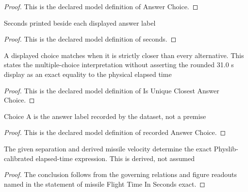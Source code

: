 \begin{proof}
  This is the declared model definition of Answer Choice.
\end{proof}
\begin{definition}[seconds]
  \label{def:physics:phyx-mini-0607:phyxminiproblems-problemphyxmini0607-answerchoice-seconds}
  Seconds printed beside each displayed answer label
\end{definition}
\begin{proof}
  This is the declared model definition of seconds.
\end{proof}
\begin{definition}
  \label{def:physics:phyx-mini-0607:phyxminiproblems-problemphyxmini0607-isuniqueclosestanswerchoice}
  A displayed choice matches when it is strictly closer than every alternative. This states the multiple-choice interpretation without asserting the rounded 31.0 s display as an exact equality to the physical elapsed time
\end{definition}
\begin{proof}
  This is the declared model definition of Is Unique Closest Answer Choice.
\end{proof}
\begin{definition}
  \label{def:physics:phyx-mini-0607:phyxminiproblems-problemphyxmini0607-recordedanswerchoice}
  Choice A is the answer label recorded by the dataset, not a premise
\end{definition}
\begin{proof}
  This is the declared model definition of recorded Answer Choice.
\end{proof}
\begin{lemma}
  \label{lem:physics:phyx-mini-0607:phyxminiproblems-problemphyxmini0607-missileflighttimeinseconds-exact}
  The given separation and derived missile velocity determine the exact Physlib-calibrated elapsed-time expression. This is derived, not assumed
\end{lemma}
\begin{proof}
  The conclusion follows from the governing relations and figure readouts named in the statement of missile Flight Time In Seconds exact.
\end{proof}
